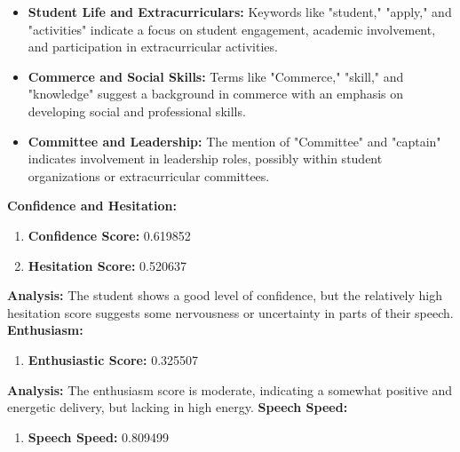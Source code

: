 \documentclass{article}
\begin{document}
    \begin{itemize}
        \item \textbf{Student Life and Extracurriculars:} Keywords like "student," "apply," and "activities" indicate a focus on student engagement, academic involvement, and participation in extracurricular activities.
        
        \item \textbf{Commerce and Social Skills:} Terms like "Commerce," "skill," and "knowledge" suggest a background in commerce with an emphasis on developing social and professional skills.
        
        \item \textbf{Committee and Leadership:} The mention of "Committee" and "captain" indicates involvement in leadership roles, possibly within student organizations or extracurricular committees.
    \end{itemize}
    \vspace{0.1in}
\large{\textbf{Confidence and Hesitation:}}
\begin{tcolorbox}[colback=green!10!white, colframe=green!80!black, title=Confidence and Hesitation Scores]
    \begin{enumerate}
        \item \textbf{Confidence Score:} \textcolor{green!50!black}{0.619852}
        \item \textbf{Hesitation Score:} \textcolor{red!70!black}{0.520637}
    \end{enumerate}
\end{tcolorbox}
    \textbf{Analysis:} The student shows a good level of confidence, but the relatively high hesitation score suggests some nervousness or uncertainty in parts of their speech.
    \vspace{0.1in}
\large{\textbf{Enthusiasm:}}
\begin{tcolorbox}[colback=orange!10!white, colframe=orange!80!black, title=Enthusiastic Score]
    \begin{enumerate}
        \item \textbf{Enthusiastic Score:} \textcolor{orange!70!black}{0.325507}
    \end{enumerate}
\end{tcolorbox}
    \textbf{Analysis:} The enthusiasm score is moderate, indicating a somewhat positive and energetic delivery, but lacking in high energy.
    \vspace{0.1in}
\large{\textbf{Speech Speed:}}
\begin{tcolorbox}[colback=purple!10!white, colframe=purple!80!black, title=Speech Speed]
    \begin{enumerate}
        \item \textbf{Speech Speed:} \textcolor{purple!70!black}{0.809499}
    \end{enumerate}
\end{tcolorbox}
\end{document}
